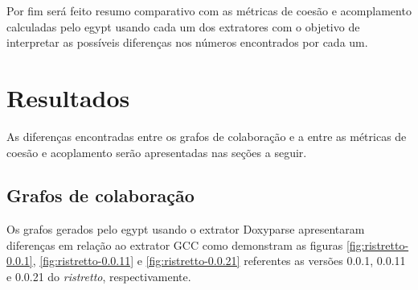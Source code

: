 Por fim será feito resumo comparativo com as métricas de coesão e acomplamento
calculadas pelo egypt usando cada um dos extratores com o objetivo de
interpretar as possíveis diferenças nos números encontrados por cada um.

\section{Resultados}

As diferenças encontradas entre os grafos de colaboração e a entre as métricas
de coesão e acoplamento serão apresentadas nas seções a seguir.

\subsection{Grafos de colaboração}

Os grafos gerados pelo egypt usando o extrator Doxyparse apresentaram
diferenças em relação ao extrator GCC como demonstram as figuras
\ref{fig:ristretto-0.0.1}, \ref{fig:ristretto-0.0.11} e
\ref{fig:ristretto-0.0.21} referentes as versões 0.0.1, 0.0.11 e 0.0.21 do {\it
ristretto}, respectivamente.

